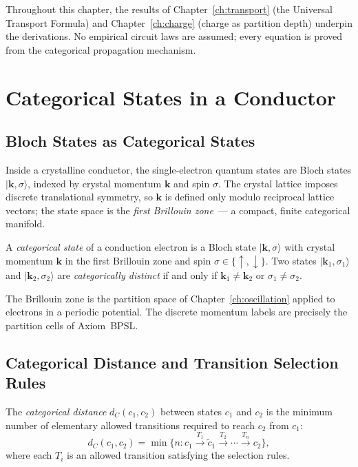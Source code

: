 Throughout this chapter, the results of Chapter~\ref{ch:transport} (the
Universal Transport Formula) and Chapter~\ref{ch:charge} (charge as
partition depth) underpin the derivations.  No empirical circuit laws are
assumed; every equation is proved from the categorical propagation
mechanism.

\section{Categorical States in a Conductor}
\label{sec:ch18-categorical}

\subsection{Bloch States as Categorical States}

Inside a crystalline conductor, the single-electron quantum states are
Bloch states $\lvert \mathbf{k}, \sigma \rangle$, indexed by crystal
momentum $\mathbf{k}$ and spin $\sigma$.  The crystal lattice imposes
discrete translational symmetry, so $\mathbf{k}$ is defined only modulo
reciprocal lattice vectors; the state space is the \emph{first Brillouin
zone}~--- a compact, finite categorical manifold.

\begin{definition}
\label{def:ch18-catstate}
A \emph{categorical state} of a conduction electron is a Bloch state
$\lvert \mathbf{k}, \sigma \rangle$ with crystal momentum $\mathbf{k}$ in
the first Brillouin zone and spin $\sigma \in \{\uparrow,\downarrow\}$.
Two states $\lvert \mathbf{k}_1, \sigma_1 \rangle$ and
$\lvert \mathbf{k}_2, \sigma_2 \rangle$ are \emph{categorically distinct}
if and only if $\mathbf{k}_1 \neq \mathbf{k}_2$ or
$\sigma_1 \neq \sigma_2$.
\end{definition}

The Brillouin zone is the partition space of Chapter~\ref{ch:oscillation}
applied to electrons in a periodic potential.  The discrete momentum labels
are precisely the partition cells of Axiom~BPSL\@.

\subsection{Categorical Distance and Transition Selection Rules}

\begin{definition}
\label{def:ch18-catdist}
The \emph{categorical distance} $d_C(c_1, c_2)$ between states $c_1$ and
$c_2$ is the minimum number of elementary allowed transitions required to
reach $c_2$ from $c_1$:
\begin{equation}
  d_C(c_1,c_2) = \min\bigl\{n : c_1 \xrightarrow{T_1} \tilde{c}_1
    \xrightarrow{T_2} \cdots \xrightarrow{T_n} c_2\bigr\},
\end{equation}
where each $T_i$ is an allowed transition satisfying the selection rules.
\end{definition}

